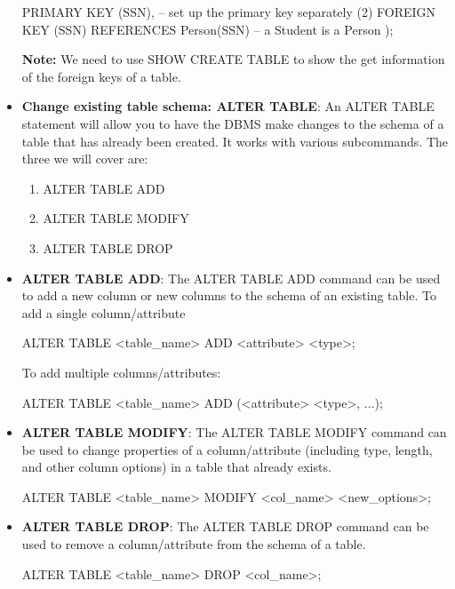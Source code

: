 \documentclass{report}
\begin{document}
\begin{itemize}
\begin{sqlcode}
                PRIMARY KEY (SSN), -- set up the primary key separately (2)
                FOREIGN KEY (SSN) REFERENCES Person(SSN) -- a Student is a Person
            );
        \end{sqlcode}
        \bigbreak \noindent 
        \textbf{Note:} We need to use SHOW CREATE TABLE to show the get information of the foreign keys of a table.
    \item \textbf{Change existing table schema: ALTER TABLE}: An ALTER TABLE statement will allow you to have the DBMS make changes to the schema of a table that has already been created. It works with various subcommands. The three we will cover are:
        \begin{enumerate}
            \item ALTER TABLE ADD
            \item ALTER TABLE MODIFY
            \item ALTER TABLE DROP
        \end{enumerate}
    \item \textbf{ALTER TABLE ADD}: The ALTER TABLE ADD command can be used to add a new column or new columns to the schema of an existing table.
        \bigbreak \noindent 
        To add a single column/attribute
        \bigbreak \noindent 
        \begin{sqlcode}
            ALTER TABLE <table_name> ADD <attribute> <type>; 
        \end{sqlcode}
        \bigbreak \noindent 
        To add multiple columns/attributes:
        \bigbreak \noindent 
        \begin{sqlcode}
            ALTER TABLE <table_name> ADD (<attribute> <type>, ...);
        \end{sqlcode}
    \item \textbf{ALTER TABLE MODIFY}: The ALTER TABLE MODIFY command can be used to change properties of a column/attribute (including type, length, and other column options) in a table that already exists.
        \bigbreak \noindent 
        \begin{sqlcode}
            ALTER TABLE <table_name> MODIFY <col_name> <new_options>;
        \end{sqlcode}
    \item \textbf{ALTER TABLE DROP}: The ALTER TABLE DROP command can be used to remove a column/attribute from the schema of a table.
        \bigbreak \noindent 
        \begin{sqlcode}
            ALTER TABLE <table_name> DROP <col_name>;
        \end{sqlcode}

\end{itemize}
\end{document}
